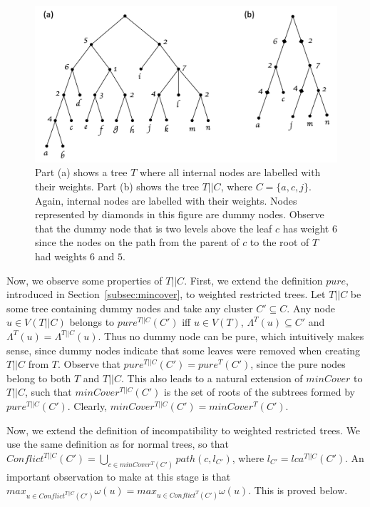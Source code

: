 \documentclass[final,1p,times]{elsarticle}
\newcommand{\leafset}{\Lambda}
\newcommand{\weight}{\omega}
\begin{document}
    \begin{figure}[ht]
        \includegraphics[scale=0.5]{dummynodes}
        \centering
        \caption[Constructing the tree $T||C$]{Part (a) shows a tree $T$ where all internal nodes are labelled with their weights. Part (b) shows the tree $T||C$, where $C = \{a, c, j\}$. Again, internal nodes are labelled with their weights. Nodes represented by diamonds in this figure are dummy nodes. Observe that the dummy node that is two levels above the leaf $c$ has weight $6$ since the nodes on the path from the parent of $c$ to the root of $T$ had weights $6$ and $5$.}
        \label{fig:dummynodes}
    \end{figure}

    Now, we observe some properties of $T||C$. First, we extend the definition $pure$, introduced in Section~\ref{subsec:mincover}, to weighted restricted trees. Let $T||C$ be some tree containing dummy nodes and take any cluster $C' \subseteq C$. Any node $u \in V(T||C)$ belongs to $pure^{T||C}(C')$ iff $u \in V(T)$, $\leafset^{T}(u) \subseteq C'$ and $\leafset^{T}(u) = \leafset^{T||C}(u)$. Thus no dummy node can be pure, which intuitively makes sense, since dummy nodes indicate that some leaves were removed when creating $T||C$ from $T$. Observe that $pure^{T||C}(C') = pure^{T}(C')$, since the pure nodes belong to both $T$ and $T||C$. This also leads to a natural extension of $minCover$ to $T||C$, such that $minCover^{T||C}(C')$ is the set of roots of the subtrees formed by $pure^{T||C}(C')$. Clearly, $minCover^{T||C}(C') = minCover^{T}(C')$.

    Now, we extend the definition of incompatibility to weighted restricted trees. We use the same definition as for normal trees, so that $Conflict^{T||C}(C') = \bigcup_{c \in minCover^{T}(C')} path(c, l_{C'})$, where $l_{C'} = lca^{T||C}(C')$. An important observation to make at this stage is that $max_{u \in Conflict^{T||C}(C')} \weight(u) = max_{u \in Conflict^{T}(C')} \weight(u)$. This is proved below.
\end{document}

